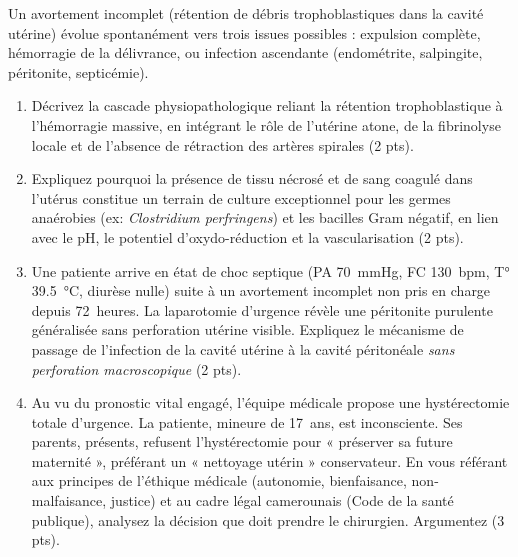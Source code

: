 \documentclass[11pt]{article}
\begin{document}
\begin{exercice}
Un avortement incomplet (rétention de débris trophoblastiques dans la cavité utérine) évolue spontanément vers trois issues possibles : expulsion complète, hémorragie de la délivrance, ou infection ascendante (endométrite, salpingite, péritonite, septicémie).
\begin{enumerate}
    \item Décrivez la cascade physiopathologique reliant la rétention trophoblastique à l'hémorragie massive, en intégrant le rôle de l'utérine atone, de la fibrinolyse locale et de l'absence de rétraction des artères spirales (2 pts).
    \item Expliquez pourquoi la présence de tissu nécrosé et de sang coagulé dans l'utérus constitue un terrain de culture exceptionnel pour les germes anaérobies (ex: \textit{Clostridium perfringens}) et les bacilles Gram négatif, en lien avec le pH, le potentiel d'oxydo-réduction et la vascularisation (2 pts).
    \item Une patiente arrive en état de choc septique (PA \SI{70}{mmHg}, FC \SI{130}{bpm}, T° \SI{39,5}{\celsius}, diurèse nulle) suite à un avortement incomplet non pris en charge depuis \SI{72}{heures}. La laparotomie d'urgence révèle une péritonite purulente généralisée sans perforation utérine visible. Expliquez le mécanisme de passage de l'infection de la cavité utérine à la cavité péritonéale \textit{sans perforation macroscopique} (2 pts).
    \item Au vu du pronostic vital engagé, l'équipe médicale propose une hystérectomie totale d'urgence. La patiente, mineure de \SI{17}{ans}, est inconsciente. Ses parents, présents, refusent l'hystérectomie pour « préserver sa future maternité », préférant un « nettoyage utérin » conservateur. En vous référant aux principes de l'éthique médicale (autonomie, bienfaisance, non-malfaisance, justice) et au cadre légal camerounais (Code de la santé publique), analysez la décision que doit prendre le chirurgien. Argumentez (3 pts).
\end{enumerate}
\end{exercice}
\end{document}
